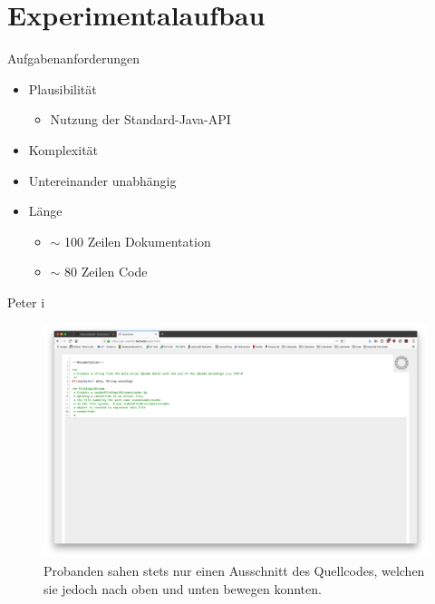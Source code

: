 \documentclass[10pt]{beamer}
\begin{document}
\section{Experimentalaufbau}

	\begin{frame}{Aufgabenanforderungen}
		\begin{itemize}
			\item Plausibilität\\
				\begin{itemize}
					\item Nutzung der Standard-Java-API
				\end{itemize}
			\vspace{\baselineskip}
			\item Komplexität\\
			\vspace{\baselineskip}
			\item Untereinander unabhängig\\
            \vspace{\baselineskip}
			\item Länge
			\begin{itemize}
				\item $\sim$ 100 Zeilen Dokumentation
				\item $\sim$ 80 Zeilen Code
			\end{itemize}
		\end{itemize}
	\end{frame}

	\begin{frame}{Peter  i}
		\begin{figure}
			\includegraphics[scale=0.15]{graphics/peter_window.png}
			\caption{\label{fig:peter_window.png} Probanden sahen stets nur einen Ausschnitt des Quellcodes, welchen sie jedoch nach oben und unten bewegen konnten.}
		\end{figure}
	\end{frame}
\end{document}
